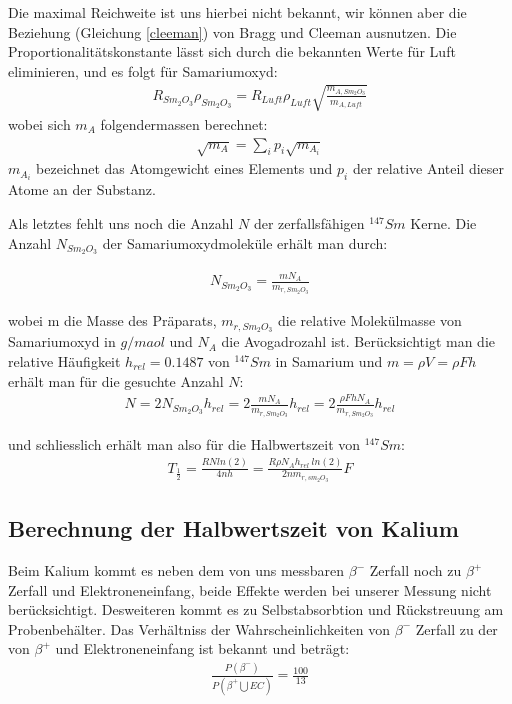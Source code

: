\documentclass[12pt]{article}
\begin{document}
Die maximal Reichweite ist uns hierbei nicht bekannt, wir können aber die Beziehung (Gleichung \ref{cleeman}) von Bragg und Cleeman ausnutzen. Die Proportionalitätskonstante lässt sich durch die bekannten Werte für Luft eliminieren, und es folgt für Samariumoxyd:
\begin{align}
 R_{Sm_2O_3} \rho_{Sm_2O_3} = R_{Luft} \rho_{Luft} \sqrt{\frac{m_{A,Sm_2O_3}}{m_{A,Luft}}}
\end{align}
wobei sich $m_A$ folgendermassen berechnet:
\begin{align}
 \sqrt{m_A}=\sum \limits_i p_i \sqrt{m_{A_i}}
\end{align}
$m_{A_i}$ bezeichnet das Atomgewicht eines Elements und $p_i$ der relative Anteil dieser Atome an der Substanz.

Als letztes fehlt uns noch die Anzahl $N$ der zerfallsfähigen $^{147}Sm$ Kerne. Die Anzahl $N_{Sm_2O_3}$ der Samariumoxydmoleküle erhält man durch:

\begin{align}
 N_{Sm_2O_3} = \frac{m N_A}{m_{r,Sm_2O_3}}
\end{align}

wobei m die Masse des Präparats, $m_{r,Sm_2O_3}$ die relative Molekülmasse von Samariumoxyd in $g/maol$ und $N_A$ die Avogadrozahl ist.
Berücksichtigt man die relative Häufigkeit $h_{rel} = 0.1487$ von $^{147}Sm$ in Samarium und $m = \rho V = \rho F h$ erhält man für die gesuchte Anzahl $N$:
\begin{align}
 N=2N_{Sm_2O_3} h_{rel}= 2 \frac{m N_A}{m_{r,Sm_2O_3}} h_{rel}=2 \frac{\rho F h N_A}{m_{r,Sm_2O_3}}h_{rel}
\end{align}

und schliesslich erhält man also für die Halbwertszeit von $^{147}Sm$:
\begin{align}
 T_{\frac{1}{2}} = \frac{R N ln(2)}{4 n h} = \frac{R \rho  N_A h_{rel} ~ ln (2)}{2n m_{r,sm_2O_3}} F
\end{align}

\label{kalium}\subsection{Berechnung der Halbwertszeit von Kalium}

Beim Kalium kommt es neben dem von uns messbaren $\beta^-$ Zerfall noch
 zu $\beta^+$ Zerfall und Elektroneneinfang, beide Effekte werden bei unserer
 Messung nicht berücksichtigt. Desweiteren kommt es zu Selbstabsorbtion und Rückstreuung 
am Probenbehälter. Das Verhältniss der Wahrscheinlichkeiten von $\beta^-$ Zerfall zu der
 von $\beta^+$ und Elektroneneinfang ist bekannt und beträgt:
\begin{align}
 \frac{P(\beta^-)}{P(\beta^+ \bigcup EC)} = \frac{100}{13}
\end{align}
\end{document}
